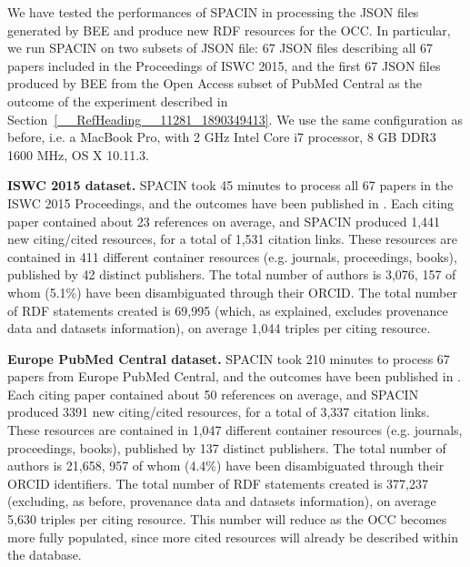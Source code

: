 \documentclass[runningheads,a4paper]{llncs}
\begin{document}
We have tested the performances of SPACIN in processing the JSON files generated by BEE and produce new RDF resources for the OCC. In particular, we run SPACIN on two subsets of JSON file: 67 JSON files describing all 67 papers included in the Proceedings of ISWC 2015, and the first 67 JSON files produced by BEE from the Open Access subset of PubMed Central as the outcome of the experiment described in Section~\ref{__RefHeading__11281_1890349413}. We use the same configuration as before, i.e. a MacBook Pro, with 2 GHz Intel Core i7 processor, 8 GB DDR3 1600 MHz, OS X 10.11.3.

{\bf ISWC 2015 dataset.} SPACIN took 45 minutes to process all 67 papers in the ISWC 2015 Proceedings, and the outcomes have been published in  \cite{__RefNumPara__5447_1890349413}. Each citing paper contained about 23 references on average, and SPACIN produced 1,441 new citing/cited resources, for a total of 1,531 citation links. These resources are contained in 411 different container resources (e.g. journals, proceedings, books), published by 42 distinct publishers. The total number of authors is 3,076, 157 of whom (5.1\%) have been disambiguated through their ORCID. The total number of RDF statements created is 69,995 (which, as explained, excludes provenance data and datasets information), on average 1,044 triples per citing resource.

{\bf Europe PubMed Central dataset.} SPACIN took 210 minutes to process 67 papers from Europe PubMed Central, and the outcomes have been published in  \cite{__RefNumPara__5449_1890349413}. Each citing paper contained about 50 references on average, and SPACIN produced 3391 new citing/cited resources, for a total of 3,337 citation links. These resources are contained in 1,047 different container resources (e.g. journals, proceedings, books), published by 137 distinct publishers. The total number of authors is 21,658, 957 of whom (4.4\%) have been disambiguated through their ORCID identifiers. The total number of RDF statements created is 377,237 (excluding, as before, provenance data and datasets information), on average 5,630 triples per citing resource. This number will reduce as the OCC becomes more fully populated, since more cited resources will already be described within the database.
\end{document}
